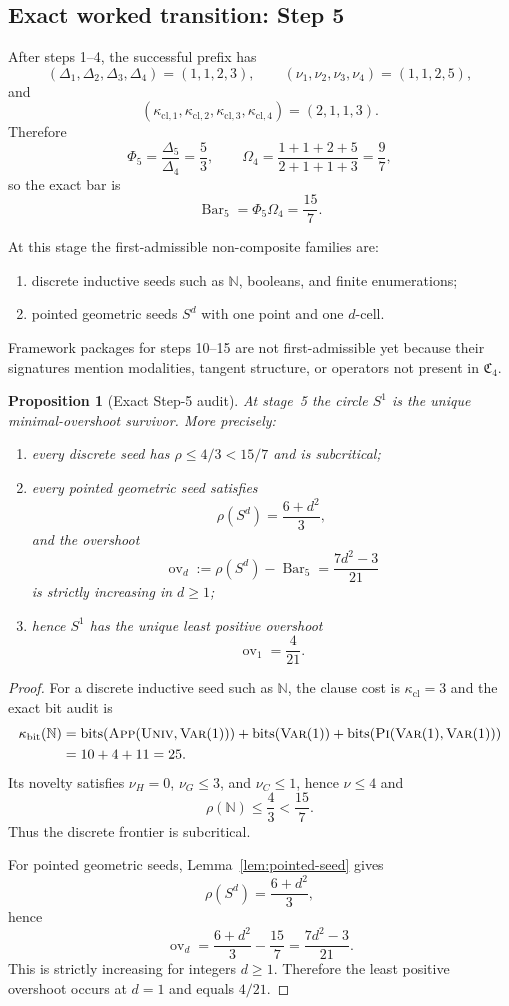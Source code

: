 \documentclass{lmcs}
\theoremstyle{plain}
\newtheorem{prop}[thm]{Proposition}
\theoremstyle{definition}
\theoremstyle{remark}
\newcommand{\N}{\ensuremath{\mathbb{N}}}
\newcommand{\Core}{\ensuremath{\mathfrak{C}}}
\newcommand{\bits}{\ensuremath{\operatorname{bits}}}
\newcommand{\SelBar}{\ensuremath{\operatorname{Bar}}}
\newcommand{\ov}{\ensuremath{\operatorname{ov}}}
\begin{document}
\subsection{Exact worked transition: Step 5}

After steps 1--4, the successful prefix has
\[
  (\Delta_1,\Delta_2,\Delta_3,\Delta_4)=(1,1,2,3),\qquad
  (\nu_1,\nu_2,\nu_3,\nu_4)=(1,1,2,5),
\]
and
\[
  (\kappa_{\mathrm{cl},1},\kappa_{\mathrm{cl},2},\kappa_{\mathrm{cl},3},\kappa_{\mathrm{cl},4})=(2,1,1,3).
\]
Therefore
\[
  \Phi_5=\frac{\Delta_5}{\Delta_4}=\frac 53,\qquad
  \Omega_4=\frac{1+1+2+5}{2+1+1+3}=\frac97,
\]
so the exact bar is
\[
  \SelBar_5=\Phi_5\Omega_4=\frac{15}{7}.
\]

At this stage the first-admissible non-composite families are:
\begin{enumerate}[label=(\alph*),nosep]
  \item discrete inductive seeds such as $\N$, booleans, and finite enumerations;
  \item pointed geometric seeds $S^d$ with one point and one $d$-cell.
\end{enumerate}
Framework packages for steps 10--15 are not first-admissible yet because their signatures mention modalities, tangent structure, or operators not present in $\Core_4$.

\begin{prop}[Exact Step-5 audit]
\label{prop:step5}
At stage~5 the circle $S^1$ is the unique minimal-overshoot survivor.
More precisely:
\begin{enumerate}[label=(\arabic*),nosep]
  \item every discrete seed has $\rho\le 4/3<15/7$ and is subcritical;
  \item every pointed geometric seed satisfies
  \[
    \rho(S^d)=\frac{6+d^2}{3},
  \]
  and the overshoot
  \[
    \ov_d:=\rho(S^d)-\SelBar_5=\frac{7d^2-3}{21}
  \]
  is strictly increasing in $d\ge 1$;
  \item hence $S^1$ has the unique least positive overshoot
  \[
    \ov_1=\frac{4}{21}.
  \]
\end{enumerate}
\end{prop}

\begin{proof}
For a discrete inductive seed such as $\N$, the clause cost is $\kappa_{\mathrm{cl}}=3$ and the exact bit audit is
\[
\begin{aligned}
  \kappa_{\mathrm{bit}}(\N)
    &= \bits(\textsc{App}(\textsc{Univ},\textsc{Var}(1)))
      + \bits(\textsc{Var}(1))
      + \bits(\textsc{Pi}(\textsc{Var}(1),\textsc{Var}(1)))\\
    &= 10+4+11 = 25.
\end{aligned}
\]
Its novelty satisfies $\nu_H=0$, $\nu_G\le 3$, and $\nu_C\le 1$, hence $\nu\le 4$ and
\[
  \rho(\N)\le \frac43 < \frac{15}{7}.
\]
Thus the discrete frontier is subcritical.

For pointed geometric seeds, Lemma~\ref{lem:pointed-seed} gives
\[
  \rho(S^d)=\frac{6+d^2}{3},
\]
hence
\[
  \ov_d=\frac{6+d^2}{3}-\frac{15}{7}
       =\frac{7d^2-3}{21}.
\]
This is strictly increasing for integers $d\ge 1$.
Therefore the least positive overshoot occurs at $d=1$ and equals $4/21$.
\end{proof}
\end{document}
